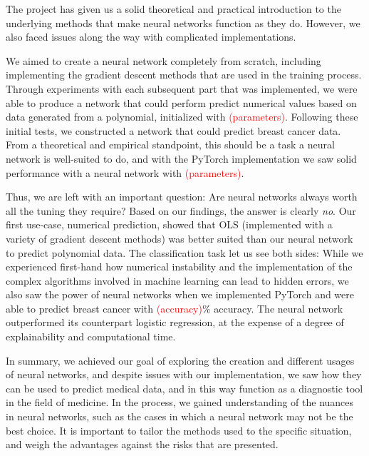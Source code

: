 The project has given us a solid theoretical and practical introduction to the underlying methods that make neural networks function as they do. However, we also faced issues along the way with complicated implementations.

We aimed to create a neural network completely from scratch, including implementing the gradient descent methods that are used in the training process. Through experiments with each subsequent part that was implemented, we were able to produce a network that could perform predict numerical values based on data generated from a polynomial, initialized with \textcolor{red}{(parameters)}. Following these initial tests, we constructed a network that could predict breast cancer data. From a theoretical and empirical standpoint, this should be a task a neural network is well-suited to do, and with the PyTorch implementation we saw solid performance with a neural network with \textcolor{red}{(parameters)}.

Thus, we are left with an important question: Are neural networks always worth all the tuning they require? Based on our findings, the answer is clearly \emph{no}. Our first use-case, numerical prediction, showed that OLS (implemented with a variety of gradient descent methods) was better suited than our neural network to predict polynomial data. The classification task let us see both sides: While we experienced first-hand how numerical instability and the implementation of the complex algorithms involved in machine learning can lead to hidden errors, we also saw the power of neural networks when we implemented PyTorch and were able to predict breast cancer with \textcolor{red}{(accuracy)}\% accuracy. The neural network outperformed its counterpart logistic regression, at the expense of a degree of explainability and computational time. 

In summary, we achieved our goal of exploring the creation and different usages of neural networks, and despite issues with our implementation, we saw how they can be used to predict medical data, and in this way function as a diagnostic tool in the field of medicine. In the process, we gained understanding of the nuances in neural networks, such as the cases in which a neural network may not be the best choice. It is important to tailor the methods used to the specific situation, and weigh the advantages against the risks that are presented.